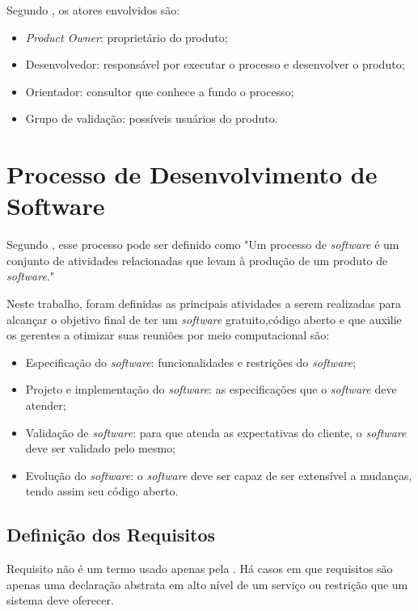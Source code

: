 Segundo , os atores envolvidos são:

\begin{itemize}
	\item \textit{Product Owner}: proprietário do produto;
	\item Desenvolvedor: responsável por executar o processo e desenvolver o produto;
	\item Orientador: consultor que conhece a fundo o processo;
	\item Grupo de validação: possíveis usuários do produto.
\end{itemize}

\section{Processo de Desenvolvimento de Software}
\label{sec:processo_de_desenvolvimento_de_software}

Segundo , esse processo pode ser definido como "Um processo de \textit{software} é um conjunto de atividades relacionadas que levam à produção de um produto de \textit{software}."

Neste trabalho, foram definidas as principais atividades a serem realizadas para alcançar o objetivo final de ter um \textit{software} gratuito,código aberto e que auxilie os gerentes a otimizar suas reuniões por meio computacional são:

\begin{itemize}
    \item Especificação do \textit{software}: funcionalidades e restrições do \textit{software};
    \item Projeto e implementação do \textit{software}: as especificações que o \textit{software} deve atender;
    \item Validação de \textit{software}: para que atenda as expectativas do cliente, o \textit{software} deve ser validado pelo mesmo;
    \item Evolução do \textit{software}: o \textit{software} deve ser capaz de ser extensível a mudanças, tendo assim seu código aberto.
\end{itemize}

\subsection{Definição dos Requisitos}

Requisito não é um termo usado apenas pela \imprimircurso. Há casos em que requisitos são apenas uma declaração abstrata em alto nível de um serviço ou restrição que um sistema deve oferecer.

